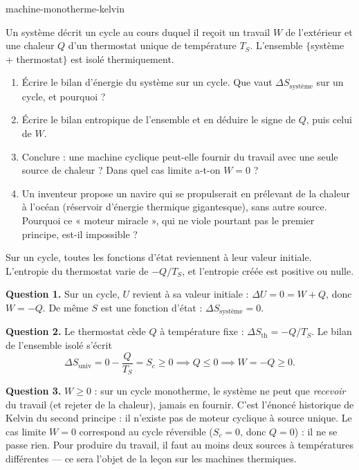 \begin{exo}{machine-monotherme-kelvin}

Un système décrit un cycle au cours duquel il reçoit un travail $W$ de l'extérieur et une chaleur $Q$ d'un thermostat unique de température $T_S$. L'ensemble $\{$système + thermostat$\}$ est isolé thermiquement.

\begin{enumerate}
\item Écrire le bilan d'énergie du système sur un cycle. Que vaut $\Delta S_{\text{système}}$ sur un cycle, et pourquoi ?
\item Écrire le bilan entropique de l'ensemble et en déduire le signe de $Q$, puis celui de $W$.
\item Conclure : une machine cyclique peut-elle fournir du travail avec une seule source de chaleur ? Dans quel cas limite a-t-on $W = 0$ ?
\item Un inventeur propose un navire qui se propulserait en prélevant de la chaleur à l'océan (réservoir d'énergie thermique gigantesque), sans autre source. Pourquoi ce « moteur miracle », qui ne viole pourtant pas le premier principe, est-il impossible ?
\end{enumerate}

\begin{indication}
Sur un cycle, toutes les fonctions d'état reviennent à leur valeur initiale. L'entropie du thermostat varie de $-Q/T_S$, et l'entropie créée est positive ou nulle.
\end{indication}

\begin{solution}
\textbf{Question 1.} Sur un cycle, $U$ revient à sa valeur initiale : $\Delta U = 0 = W + Q$, donc $W = -Q$. De même $S$ est une fonction d'état : $\Delta S_{\text{système}} = 0$.

\textbf{Question 2.} Le thermostat cède $Q$ à température fixe : $\Delta S_{\text{th}} = -Q/T_S$. Le bilan de l'ensemble isolé s'écrit
\[
\Delta S_{\text{univ}} = 0 - \frac{Q}{T_S} = S_c \geq 0 \implies Q \leq 0 \implies W = -Q \geq 0.
\]

\textbf{Question 3.} $W \geq 0$ : sur un cycle monotherme, le système ne peut que \emph{recevoir} du travail (et rejeter de la chaleur), jamais en fournir. C'est l'énoncé historique de Kelvin du second principe : il n'existe pas de moteur cyclique à source unique. Le cas limite $W = 0$ correspond au cycle réversible ($S_c = 0$, donc $Q = 0$) : il ne se passe rien. Pour produire du travail, il faut au moins deux sources à températures différentes — ce sera l'objet de la leçon sur les machines thermiques.


\end{solution}
\end{exo}
